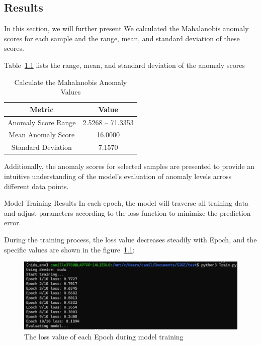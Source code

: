 \begin{ZhChapter}

    \chapter{Results}

    In this section, we will further present
    We calculated the Mahalanobis anomaly scores for each sample and the range, mean, and standard deviation of these scores.



    Table~\ref{tab:mahalanobis_scores} lists the range, mean, and standard deviation of the anomaly scores


    \begin{table}[htbp]
        \centering
        \caption{Calculate the Mahalanobis Anomaly Values}
        \label{tab:mahalanobis_scores}
        \begin{tabular}{|c|c|}
            \hline
            \textbf{Metric}     & \textbf{Value}    \\
            \hline
            Anomaly Score Range & 2.5268 -- 71.3353 \\
            Mean Anomaly Score  & 16.0000           \\
            Standard Deviation  & 7.1570            \\
            \hline
        \end{tabular}
    \end{table}





    Additionally, the anomaly scores for selected samples are presented to provide an intuitive understanding of the model's evaluation of anomaly levels across different data points.



    Model Training Results
    In each epoch, the model will traverse all training data and adjust parameters according to the loss function to minimize the prediction error.

    During the training process, the loss value decreases steadily with Epoch, and the specific values are shown in the figure~\ref{fig:Train}:


    \begin{figure}[htbp]
        \centering
        \includegraphics[width = 1\textwidth]{image/Train.jpg}
        \caption{The loss value of each Epoch during model training}
        \label{fig:Train}
    \end{figure}


\end{ZhChapter}
